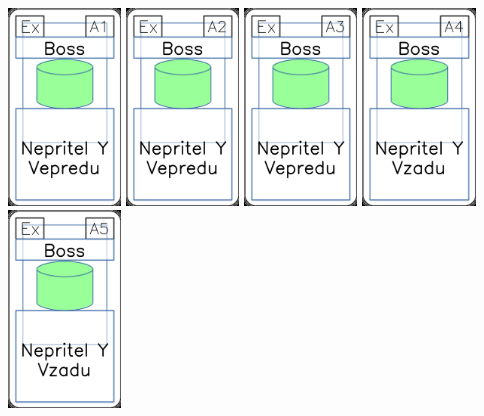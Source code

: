 \documentclass[a4paper]{article}
\begin{document}
	\includegraphics[width=3.0cm]{img-4_0}
	\includegraphics[width=3.0cm]{img-4_1}
	\includegraphics[width=3.0cm]{img-4_2}
	\includegraphics[width=3.0cm]{img-4_3}
	\includegraphics[width=3.0cm]{img-4_4}
\end{document}
